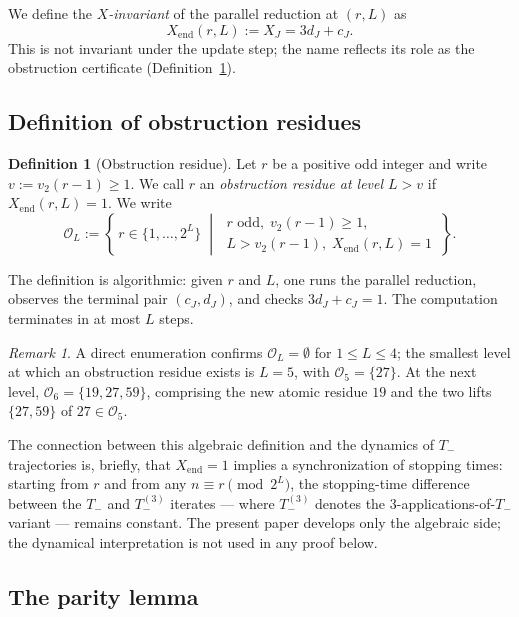 \documentclass[11pt,reqno]{amsart}
\theoremstyle{plain}
\theoremstyle{definition}
\newtheorem{definition}[theorem]{Definition}
\theoremstyle{remark}
\newtheorem{remark}[theorem]{Remark}
\newcommand{\Tminus}{T_{-}}
\newcommand{\Obs}{\mathcal{O}}
\newcommand{\Xend}{X_{\mathrm{end}}}
\newcommand{\vtwo}{v_{2}}
\begin{document}
We define the \emph{$X$-invariant} of the parallel reduction at $(r, L)$ as
\[
\Xend(r, L) := X_J = 3 d_J + c_J.
\]
This is not invariant under the update step; the name reflects its role
as the obstruction certificate (Definition~\ref{def:obstruction}).

\subsection{Definition of obstruction residues}

\begin{definition}[Obstruction residue]
\label{def:obstruction}
Let $r$ be a positive odd integer and write $v := \vtwo(r-1) \ge 1$. We
call $r$ an \emph{obstruction residue at level $L > v$} if $\Xend(r, L) = 1$.
We write
\[
\Obs_L := \left\{\, r \in \{1, \ldots, 2^L\}
  \;\middle|\;
  \begin{array}{l}
  r \text{ odd},\; \vtwo(r-1) \ge 1, \\
  L > \vtwo(r-1),\; \Xend(r, L) = 1
  \end{array}
\,\right\}.
\]
\end{definition}

The definition is algorithmic: given $r$ and $L$, one runs the parallel
reduction, observes the terminal pair $(c_J, d_J)$, and checks
$3 d_J + c_J = 1$. The computation terminates in at most $L$ steps.

\begin{remark}\label{rem:smallest-level}
A direct enumeration confirms $\Obs_L = \emptyset$ for $1 \le L \le 4$;
the smallest level at which an obstruction residue exists is $L = 5$,
with $\Obs_5 = \{27\}$. At the next level,
$\Obs_6 = \{19, 27, 59\}$, comprising the new atomic residue $19$
and the two lifts $\{27, 59\}$ of $27 \in \Obs_5$.
\end{remark}

The connection between this algebraic definition and the dynamics of
$\Tminus$ trajectories is, briefly, that $\Xend = 1$ implies a
synchronization of stopping times: starting from $r$ and from any
$n \equiv r \pmod{2^L}$, the stopping-time difference between the
$\Tminus$ and $\Tminus^{(3)}$ iterates --- where $\Tminus^{(3)}$ denotes the
$3$-applications-of-$\Tminus$ variant --- remains constant. The present
paper develops only the algebraic side; the dynamical interpretation is
not used in any proof below.

\subsection{The parity lemma}
\end{document}
